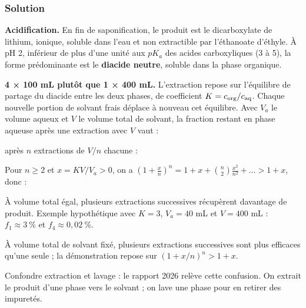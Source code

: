\documentclass[11pt,a4paper]{article}
\newcommand{\equationajustee}[1]{%
  \sbox{\boiteequation}{$\displaystyle #1$}%
  \ifdim\wd\boiteequation>\linewidth
    \[\resizebox{\linewidth}{!}{\usebox{\boiteequation}}\]%
  \else
    \[#1\]%
  \fi}
\begin{document}
\hypertarget{solution-35}{%
\subsubsection{Solution}\label{solution-35}}

\textbf{Acidification.} En fin de saponification, le produit est le dicarboxylate de lithium, ionique, soluble dans l'eau et non extractible par l'éthanoate d'éthyle. À pH 2, inférieur de plus d'une unité aux \(pK_a\) des acides carboxyliques (3 à 5), la forme prédominante est le \textbf{diacide neutre}, soluble dans la phase organique.

\textbf{4 × 100 mL plutôt que 1 × 400 mL.} L'extraction repose sur l'équilibre de partage du diacide entre les deux phases, de coefficient \(K=c_{\rm org}/c_{\rm aq}\). Chaque nouvelle portion de solvant frais déplace à nouveau cet équilibre. Avec \(V_a\) le volume aqueux et \(V\) le volume total de solvant, la fraction restant en phase aqueuse après une extraction avec \(V\) vaut :

\equationajustee{f_1=\frac{1}{1+KV/V_a};}

après \(n\) extractions de \(V/n\) chacune :

\equationajustee{f_n=\left(\frac{1}{1+KV/(nV_a)}\right)^n.}

Pour \(n\ge2\) et \(x=KV/V_a>0\), on a \(\left(1+\frac{x}{n}\right)^n=1+x+\binom n2\frac{x^2}{n^2}+\dots>1+x\), donc :

\equationajustee{\boxed{f_n<f_1}}

À volume total égal, plusieurs extractions successives récupèrent davantage de produit. Exemple hypothétique avec \(K=3\), \(V_a=40\) mL et \(V=400\) mL : \(f_1\approx3\ \%\) et \(f_4\approx0{,}02\ \%\).

\begin{methode}

À volume total de solvant fixé, plusieurs extractions successives sont plus efficaces qu'une seule ; la démonstration repose sur \((1+x/n)^n>1+x\).

\end{methode}

\begin{piege}

Confondre extraction et lavage : le rapport 2026 relève cette confusion. On extrait le produit d'une phase vers le solvant ; on lave une phase pour en retirer des impuretés.

\end{piege}
\end{document}
